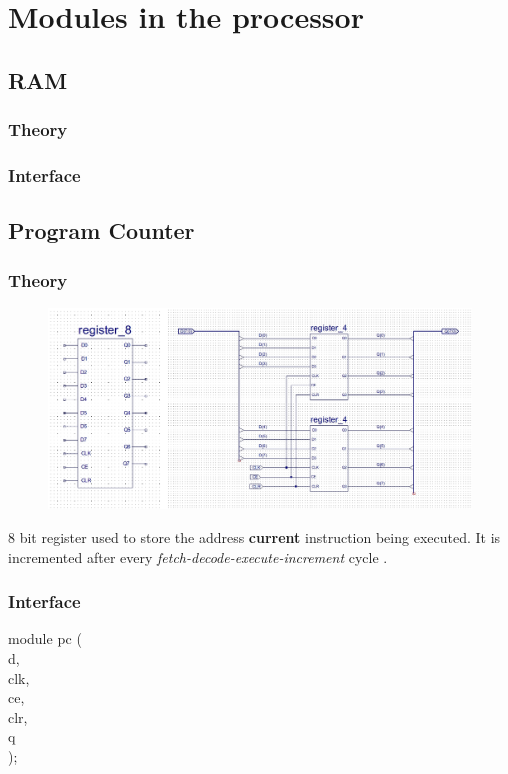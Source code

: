 \documentclass[11pt]{article}
\begin{document}
\section{Modules in the processor}
\label{sec:org518769f}
\subsection{RAM}
\label{sec:org6b815bf}
\subsubsection{Theory}
\label{sec:org3d2a14e}
\subsubsection{Interface}
\label{sec:org3e7ed94}
\subsection{Program Counter}
\label{sec:org1ef0d14}
\subsubsection{Theory}
\label{sec:org2f62f45}
\begin{figure}[htbp]
\centering
\includegraphics[width=.9\linewidth]{./images/reg8.jpg}
\caption{\label{fig:orgdae6e73}
}
\end{figure}
8 bit register used to store the address \textbf{current} instruction being executed.
It is incremented after every \emph{fetch-decode-execute-increment} cycle .
\subsubsection{Interface}
\label{sec:org9c8ca71}
module pc (\\
d,\\
clk,\\
ce,\\
clr,\\
q\\
);
\end{document}
